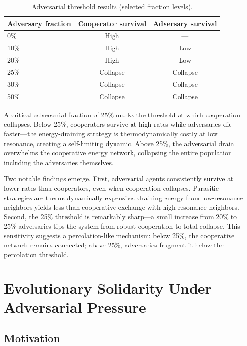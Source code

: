 \documentclass[12pt,a4paper]{article}
\begin{document}
\begin{table}[H]
\centering
\caption{Adversarial threshold results (selected fraction levels).}
\label{tab:adversarial}
\begin{tabular}{@{}lcc@{}}
\toprule
\textbf{Adversary fraction} & \textbf{Cooperator survival} & \textbf{Adversary survival} \\
\midrule
0\%  & High  & --- \\
10\% & High  & Low \\
20\% & High  & Low \\
25\% & Collapse & Collapse \\
30\% & Collapse & Collapse \\
50\% & Collapse & Collapse \\
\bottomrule
\end{tabular}
\end{table}

A critical adversarial fraction of 25\% marks the threshold at which cooperation collapses. Below 25\%, cooperators survive at high rates while adversaries die faster---the energy-draining strategy is thermodynamically costly at low resonance, creating a self-limiting dynamic. Above 25\%, the adversarial drain overwhelms the cooperative energy network, collapsing the entire population including the adversaries themselves.

Two notable findings emerge. First, adversarial agents consistently survive at lower rates than cooperators, even when cooperation collapses. Parasitic strategies are thermodynamically expensive: draining energy from low-resonance neighbors yields less than cooperative exchange with high-resonance neighbors. Second, the 25\% threshold is remarkably sharp---a small increase from 20\% to 25\% adversaries tips the system from robust cooperation to total collapse. This sensitivity suggests a percolation-like mechanism: below 25\%, the cooperative network remains connected; above 25\%, adversaries fragment it below the percolation threshold.

\section{Evolutionary Solidarity Under Adversarial Pressure}
\label{sec:solidarity}

\subsection{Motivation}
\end{document}
